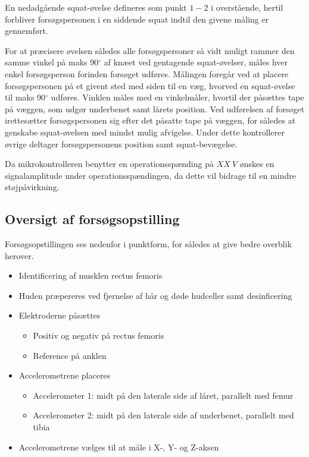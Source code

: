 En nedadgående squat-øvelse defineres som punkt $1-2$ i overstående, hertil forbliver forsøgspersonen i en siddende squat indtil den givene måling er gennemført.

For at præcisere øvelsen således alle forsøgspersoner så vidt muligt rammer den samme vinkel på maks  90$^{\circ}$ af knæet ved gentagende squat-øvelser, måles hver enkel forsøgsperson forinden forsøget udføres. Målingen foregår ved at placere forsøgspersonen på et givent sted med siden til en væg, hvorved en squat-øvelse til maks 90$^{\circ}$ udføres. Vinklen måles med en vinkelmåler, hvortil der påsættes tape på væggen, som udgør underbenet samt lårets position.
Ved udførelsen af forsøget irettesætter forsøgspersonen sig efter det påsatte tape på væggen, for således at genskabe squat-øvelsen med mindst mulig afvigelse. Under dette kontrollerer øvrige deltager forsøgspersonens position samt squat-bevægelse.

Da mikrokontrolleren benytter en operationsspænding på $XX~V$ ønskes en signalamplitude under operationsspændingen, da dette vil bidrage til en mindre støjpåvirkning. 



\subsection{Oversigt af forsøgsopstilling}
Forsøgsopstillingen ses nedenfor i punktform, for således at give bedre overblik herover. 

\begin{itemize}
\item Identificering af musklen rectus femoris %
\item Huden præpereres ved fjernelse af hår og døde hudceller samt desinficering 
\item Elektroderne påsættes
	\begin{itemize}
	\item Positiv og negativ på rectus femoris
	\item Reference på anklen
	\end{itemize} 
\item Accelerometrene placeres 
	\begin{itemize}
	\item Accelerometer 1: midt på den laterale side af låret, parallelt med femur
	\item Accelerometer 2: midt på den laterale side af underbenet, parallelt med tibia 
	\end{itemize}
\item Accelerometrene vælges til at måle i X-, Y- og Z-aksen
\end{itemize}

